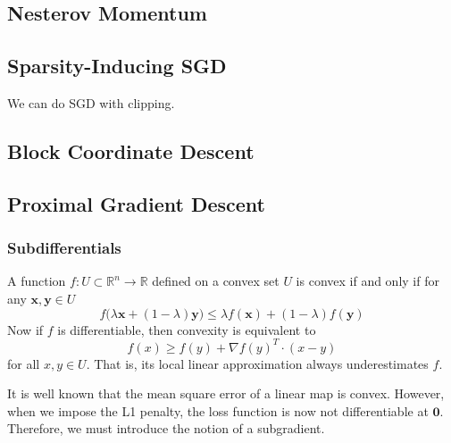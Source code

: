 \subsection{Nesterov Momentum}

\subsection{Sparsity-Inducing SGD} 

  We can do SGD with clipping. 

\subsection{Block Coordinate Descent} 

\subsection{Proximal Gradient Descent}

  \subsubsection{Subdifferentials}

    \begin{definition}
      A function $f: U \subset \mathbb{R}^n \rightarrow \mathbb{R}$ defined on a convex set $U$ is convex if and only if for any $\mathbf{x}, \mathbf{y} \in U$
      \begin{equation}
        f \big(\lambda \mathbf{x} + (1 - \lambda) \mathbf{y} \big) \leq \lambda f(\mathbf{x}) + (1 - \lambda) f(\mathbf{y})
      \end{equation}
      Now if $f$ is differentiable, then convexity is equivalent to 
      \begin{equation}
        f(x) \geq f(y) + \nabla f(y)^T \cdot (x - y)
      \end{equation}
      for all $x, y \in U$. That is, its local linear approximation always underestimates $f$. 
    \end{definition}

    It is well known that the mean square error of a linear map is convex. However, when we impose the L1 penalty, the loss function is now not differentiable at $\mathbf{0}$. Therefore, we must introduce the notion of a subgradient. 

